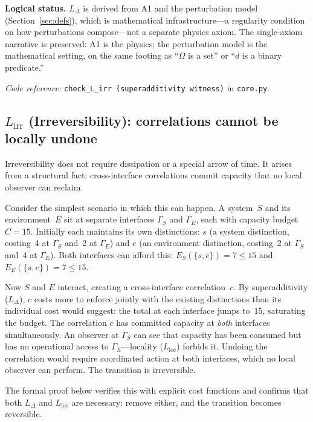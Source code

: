 \documentclass[11pt]{article}
\newcommand{\coderef}[2]{\smallskip\noindent\textit{Code reference:} \texttt{#1} in \texttt{#2}.}
\begin{document}
\begin{tcolorbox}[apfbox, title={$L_{\Delta}$ (Competition): Superadditivity from Shared Budgets}]
\smallskip\noindent\textbf{Logical status.}  $L_\Delta$ is derived from A1 and the perturbation model (Section~\ref{sec:defs}), which is mathematical infrastructure---a regularity condition on how perturbations compose---not a separate physics axiom.  The single-axiom narrative is preserved: A1 is the physics; the perturbation model is the mathematical setting, on the same footing as ``$\Omega$ is a set'' or ``$d$ is a binary predicate.''

\coderef{check\_L\_irr (superadditivity witness)}{core.py}
\end{tcolorbox}


\subsection{\texorpdfstring{$L_{\mathrm{irr}}$}{L irr} (Irreversibility): correlations cannot be locally undone}

Irreversibility does not require dissipation or a special arrow of time.  It arises from a structural fact: cross-interface correlations commit capacity that no local observer can reclaim.

Consider the simplest scenario in which this can happen.  A system~$S$ and its environment~$E$ sit at separate interfaces $\Gamma_S$ and $\Gamma_E$, each with capacity budget $C = 15$.  Initially each maintains its own distinctions: $s$ (a system distinction, costing~4 at $\Gamma_S$ and~2 at $\Gamma_E$) and $e$ (an environment distinction, costing~2 at $\Gamma_S$ and~4 at $\Gamma_E$).  Both interfaces can afford this: $E_S(\{s,e\}) = 7 \le 15$ and $E_E(\{s,e\}) = 7 \le 15$.

Now $S$ and $E$ interact, creating a cross-interface correlation~$c$.  By superadditivity ($L_\Delta$), $c$ costs more to enforce jointly with the existing distinctions than its individual cost would suggest: the total at each interface jumps to~15, saturating the budget.  The correlation $c$ has committed capacity at \emph{both} interfaces simultaneously.  An observer at $\Gamma_S$ can see that capacity has been consumed but has no operational access to $\Gamma_E$---locality ($L_{\mathrm{loc}}$) forbids it.  Undoing the correlation would require coordinated action at both interfaces, which no local observer can perform.  The transition is irreversible.

The formal proof below verifies this with explicit cost functions and confirms that both $L_\Delta$ and $L_{\mathrm{loc}}$ are necessary: remove either, and the transition becomes reversible.
\end{document}
